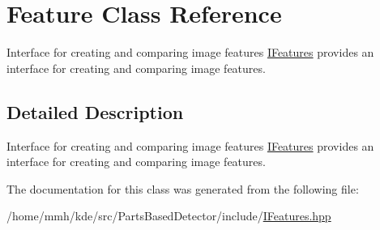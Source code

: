 \hypertarget{classFeature}{\section{Feature Class Reference}
\label{classFeature}
}


Interface for creating and comparing image features \hyperlink{classIFeatures}{I\-Features} provides an interface for creating and comparing image features.  




\subsection{Detailed Description}
Interface for creating and comparing image features \hyperlink{classIFeatures}{I\-Features} provides an interface for creating and comparing image features. 

The documentation for this class was generated from the following file\-:\begin{DoxyCompactItemize}
\item 
/home/mmh/kde/src/\-Parts\-Based\-Detector/include/\hyperlink{IFeatures_8hpp}{I\-Features.\-hpp}\end{DoxyCompactItemize}
